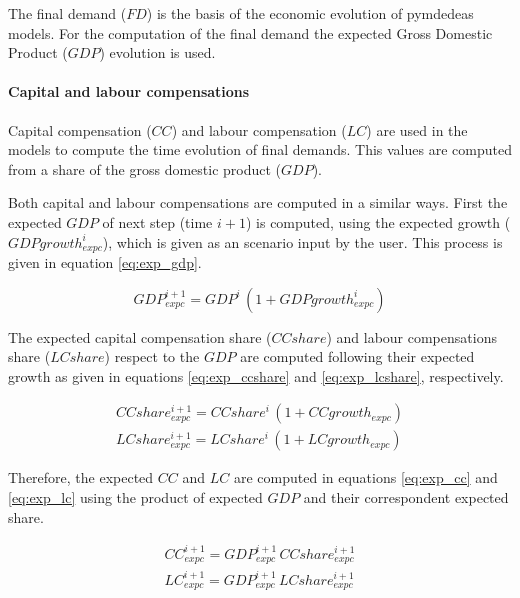 The final demand ($FD$) is the basis of the economic evolution of pymdedeas models. For the computation of the final demand the expected Gross Domestic Product ($GDP$) evolution is used.

\paragraph{Capital and labour compensations}


Capital compensation ($CC$) and labour compensation ($LC$) are used in the models to compute the time evolution of final demands. This values are computed from a share of the gross domestic product ($GDP$).

Both capital and labour compensations are computed in a similar ways. First the expected $GDP$ of next step (time $i\!+\!1$) is computed, using the expected growth ($GDPgrowth^{i}_{expc}$), which is  given as an scenario input by the user. This process is given in equation \eqref{eq:exp_gdp}.

\begin{equation}
GDP_{expc}^{i+1} = GDP^i\,(1+GDPgrowth^{i}_{expc})
\label{eq:exp_gdp}
\end{equation}

The expected capital compensation share ($CCshare$) and labour compensations share ($LCshare$) respect to the $GDP$ are computed following their expected growth as given in equations \eqref{eq:exp_ccshare} and \eqref{eq:exp_lcshare}, respectively.

\begin{gather}
CCshare_{expc}^{i+1} = CCshare^i\,(1+CCgrowth_{expc}) \label{eq:exp_ccshare}\\
LCshare_{expc}^{i+1} = LCshare^i\,(1+LCgrowth_{expc}) \label{eq:exp_lcshare}
\end{gather}

Therefore, the expected $CC$ and $LC$ are computed in equations \eqref{eq:exp_cc} and \eqref{eq:exp_lc} using the product of expected $GDP$ and their correspondent expected share.

\begin{gather}
CC_{expc}^{i+1} = GDP_{expc}^{i+1} \, CCshare_{expc}^{i+1}\label{eq:exp_cc}\\
LC_{expc}^{i+1} = GDP_{expc}^{i+1} \, LCshare_{expc}^{i+1}\label{eq:exp_lc}
\end{gather}

